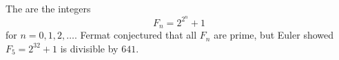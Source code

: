 The  are the integers
$$F_n = 2^{2^n} + 1$$
for $n = 0, 1, 2, \ldots$. Fermat conjectured that all $F_n$ are prime, but Euler showed $F_5 = 2^{32} + 1$ is divisible by $641$.
